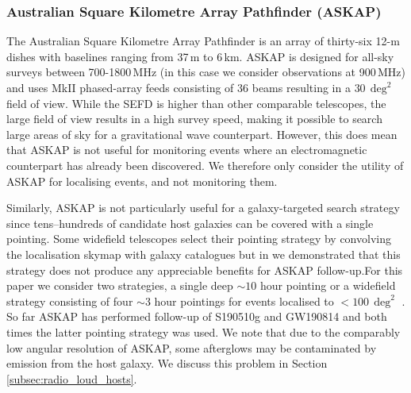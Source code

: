 \subsubsection{Australian Square Kilometre Array Pathfinder (ASKAP)}
The Australian Square Kilometre Array Pathfinder \citep[ASKAP;][Hotan et al., submitted]{2008ExA....22..151J} is an array of thirty-six 12-m dishes with baselines ranging from 37\,m to 6\,km. ASKAP is designed for all-sky surveys between 700-1800\,MHz (in this case we consider observations at 900\,MHz) and uses MkII phased-array feeds \citep{HampsonPAF} consisting of 36 beams resulting in a $30\,\deg^2$ field of view. While the SEFD is higher than other comparable telescopes, the large field of view results in a high survey speed, making it possible to search large areas of sky for a gravitational wave counterpart. However, this does mean that ASKAP is not useful for monitoring events where an electromagnetic counterpart has already been discovered. We therefore only consider the utility of ASKAP for localising events, and not monitoring them.

Similarly, ASKAP is not particularly useful for a galaxy-targeted search strategy since tens--hundreds of candidate host galaxies can be covered with a single pointing. Some widefield telescopes select their pointing strategy by convolving the localisation skymap with galaxy catalogues \citep[e.g.,][]{2016MNRAS.462.1591E} but in \citet{2019PASA...36...19D} we demonstrated that this strategy does not produce any appreciable benefits for ASKAP follow-up.For this paper we consider two strategies, a single deep $\sim 10$ hour pointing or a widefield strategy consisting of four $\sim 3$ hour pointings for events localised to $<100\,\deg^2$ \citep[corresponding to $\sim 60\%$ of neutron star mergers during O4, and the majority of mergers detected with 3G detectors][]{2018LRR....21....3A,2019CQGra..36v5002H}. So far ASKAP has performed follow-up of S190510g and GW190814 \citep[][Dobie et al. in prep.]{2019ApJ...887L..13D} and both times the latter pointing strategy was used. We note that due to the comparably low angular resolution of ASKAP, some afterglows may be contaminated by emission from the host galaxy. We discuss this problem in Section \ref{subsec:radio_loud_hosts}.

